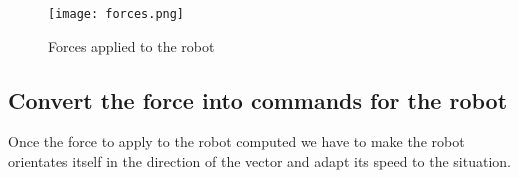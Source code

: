 \FloatBarrier
\begin{figure}
    \centering\texttt{[image: forces.png]}
    \label{fig:forces}
    \caption{Forces applied to the robot}
\end{figure}
\FloatBarrier

\subsection{Convert the force into commands for the robot}

Once the force to apply to the robot computed we have to make the robot orientates itself in the direction of the vector and adapt its speed to the situation.

